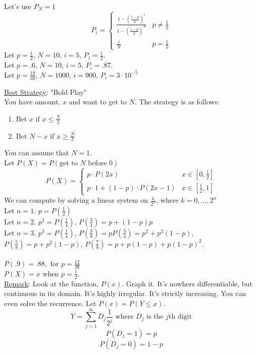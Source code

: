     Let's use $P_N = 1$
    $$
      P_i = \begin{cases}
        \frac{1 - \left(\frac{1 - p}{p}\right)^i}{1 - \left(\frac{1 - p}{p}\right)^N} & p \not= \frac{1}{2}\\
        \frac{i}{N} & p = \frac{1}{2}
      \end{cases}
    $$
    Let $p = \frac{1}{2}$, $N = 10$, $i = 5$, $P_i = \frac{1}{2}$.\\
    Let $p = .6$, $N = 10$, $i = 5$, $P_i = .87$.\\
    Let $p = \frac{18}{38}$, $N = 1000$, $i = 900$, $P_i = 3 \cdot 10^{-5}$

    \noindent\underline{Best Strategy}: "Bold Play"\\
      You have amount, $x$ and want to get to $N$. The strategy is as follows:
      \begin{enumerate}
        \item Bet $x$ if $x \le \frac{N}{2}$
        \item Bet $N - x$ if $x \ge \frac{N}{2}$
      \end{enumerate}
      You can assume that $N = 1$.\\
      Let $P(X) = P(\text{get to $N$ before 0})$\\
      $$
        P(X) = \begin{cases}
          p \cdot P(2x) & x \in [0, \frac{1}{2}]\\
          p \cdot 1 + (1-p) \cdot P(2x - 1) & x \in [\frac{1}{2}, 1]
        \end{cases}
      $$
      We can compute by solving a linear system on $\frac{k}{2^n}$, where $k = 0, \ldots, 2^n$\\
      Let $n = 1$. $p = P\left(\frac{1}{2}\right)$\\
      Let $n = 2$. $p^2 = P\left(\frac{1}{4}\right)$, $P\left(\frac{3}{4}\right) = p + (1-p)p$\\
      Let $n = 3$. $p^3 = P\left(\frac{1}{4}\right)$, 
        $P\left(\frac{3}{8}\right) = pP\left(\frac{3}{4}\right) = p^2 + p^2(1-p)$,
        $P\left(\frac{5}{8}\right) = p +  p^2(1-p)$,
        $P\left(\frac{7}{8}\right) = p +  p(1-p) + p(1-p)^2$.\\\\
      $P(.9) = .88, \text{ for } p = \frac{12}{38}$\\
      $P(X) = x$ when $p = \frac{1}{2}$.\\
    
    \noindent\underline{Remark}: Look at the function, $P(x)$. Graph it. It's nowhere
      differentiable, but continuous in its domain. It's highly irregular. It's
      strictly increasing. You can even solve the recurrence. Let $P(x) = P(Y \le x)$.\\
      $$
        Y = \sum_{j = 1}^{\infty} D_j \frac{1}{2^j} \text{ where $D_j$ is the $j$th digit}
      $$
      $$
        P(D_j = 1) = p
      $$
      $$
        P(D_j = 0) = 1- p
      $$

